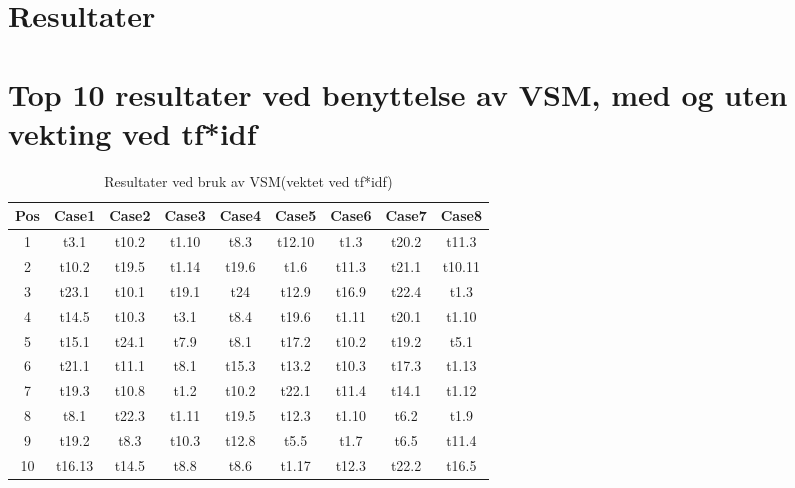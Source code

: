 \section{Resultater}
\label{sec:result}

\section{Top 10 resultater ved benyttelse av VSM, med og uten vekting ved tf*idf}

\begin{table}[h!]
\begin{center}
\begin{tabular}{ | c c c c c c c c c | }
\hline
\textbf{Pos} & \textbf{Case1} & \textbf{Case2} & \textbf{Case3} & \textbf{Case4} & \textbf{Case5} & \textbf{Case6} & \textbf{Case7} & \textbf{Case8} \\ \hline
1 & t3.1 & t10.2 & t1.10 & t8.3 & t12.10 & t1.3 & t20.2 & t11.3 \\
2 & t10.2 & t19.5 & t1.14 & t19.6 & t1.6 & t11.3 & t21.1 & t10.11 \\
3 & t23.1 & t10.1 & t19.1 & t24 & t12.9 & t16.9 & t22.4 & t1.3 \\
4 & t14.5 & t10.3 & t3.1 & t8.4 & t19.6 & t1.11 & t20.1 & t1.10 \\
5 & t15.1 & t24.1 & t7.9 & t8.1 & t17.2 & t10.2 & t19.2 & t5.1 \\
6 & t21.1 & t11.1 & t8.1 & t15.3 & t13.2 & t10.3 & t17.3 & t1.13 \\
7 & t19.3 & t10.8 & t1.2 & t10.2 & t22.1 & t11.4 & t14.1 & t1.12 \\
8 & t8.1 & t22.3 & t1.11 & t19.5 & t12.3 & t1.10 & t6.2 & t1.9 \\
9 & t19.2 & t8.3 & t10.3 & t12.8 & t5.5 & t1.7 & t6.5 & t11.4 \\
10 & t16.13 & t14.5 & t8.8 & t8.6 & t1.17 & t12.3 & t22.2 & t16.5 \\
\hline
\end{tabular}
\end{center}
\caption{Resultater ved bruk av VSM(vektet ved tf*idf)}
\end{table}

